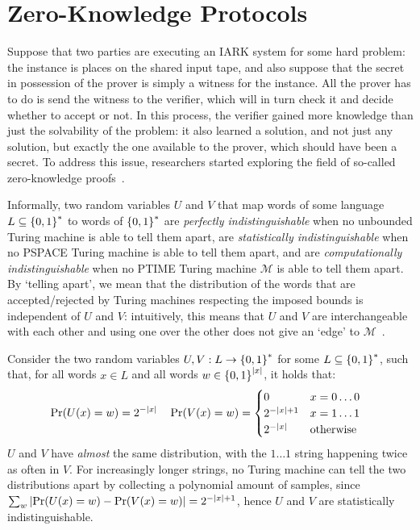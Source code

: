\section{Zero-Knowledge Protocols}\label{sec:zero_knowledge}
Suppose that two parties are executing an IARK system for some hard problem: the instance is places 
on the shared input tape, and also suppose that the secret in possession of the prover is simply 
a witness for the instance. 
All the prover has to do is send the witness to the verifier, which will in turn check it and 
decide whether to accept or not.
In this process, the verifier gained more knowledge than just the solvability of the problem: it 
also learned a solution, and not just any solution, but exactly the one available to the prover,
which should have been a secret.
To address this issue, researchers started exploring the field of so-called zero-knowledge 
proofs~\cite{GoldwasserMR1989,GoldreichMW1991}.

Informally, two random variables \(U\) and \(V\) that map words of some language 
\(L \subseteq \left\{0, 1\right\}^{*}\) to words of \(\left\{0, 1\right\}^{*}\) are 
\emph{perfectly indistinguishable} when no unbounded Turing machine is able to tell them apart,
are \emph{statistically indistinguishable} when no \textsc{PSPACE} Turing machine is able to 
tell them apart, and are \emph{computationally indistinguishable} when no \textsc{PTIME} Turing 
machine \(\mathcal{M}\) is able to tell them apart.
By `telling apart', we mean that the distribution of the words that are accepted/rejected 
by Turing machines respecting the imposed bounds is independent of \(U\) and \(V\): intuitively,
this means that \(U\) and \(V\) are interchangeable with each other and using one over the other 
does not give an `edge' to \(\mathcal{M}\)~\cite{GoldwasserM1984,GoldwasserMR1989,Yao1982}.
\begin{example}
  Consider the two random variables \(U, V: L \to \left\{0, 1\right\}^{*}\) for some 
  \(L \subseteq \left\{0, 1\right\}^{*}\), such that, for all words \(x \in L\) and all words 
  \(w \in \left\{0, 1\right\}^{\left\lvert x\right\rvert}\), it holds that:
  \begin{align*}
    & \call{\Pr}{\call{U}{x} = w} = 2^{-\abs{x}} &&
    \call{\Pr}{\call{V}{x} = w} = \begin{cases}
      0 & x = 0\dots0 \\
      2^{-\abs{x} + 1} & x = 1\dots1 \\
      2^{-\abs{x}} & \textrm{otherwise}
    \end{cases}
  \end{align*}
  \(U\) and \(V\) have \emph{almost} the same distribution, with the \(1\dots1\) string 
  happening twice as often in \(V\). 
  For increasingly longer strings, no Turing machine can tell the two distributions apart by 
  collecting a polynomial amount of samples, since 
  \(\sum_{w}{\abs{\call{\Pr}{\call{U}{x} = w} - \call{\Pr}{\call{V}{x} = w}}} = 2^{-\abs{x}+1}\),
  hence \(U\) and \(V\) are statistically indistinguishable.
\end{example}

